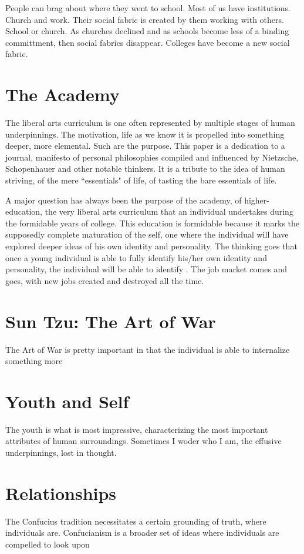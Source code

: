 \documentclass[12pt,letterpaper]{article}
\begin{document}
People can brag about where they went to school.  Most of us have institutions.  Church and work.  Their social fabric is created by them working with others.  School or church.  As churches declined and as schools become less of a binding committment, then social fabrics disappear.  Colleges have become a new social fabric.  



\section{The Academy}
The liberal arts curriculum is one often represented by multiple stages of human underpinnings.  The motivation, life as we know it is propelled into something deeper, more elemental.  Such are the purpose.  This paper is a dedication to a journal, manifesto of personal philosophies compiled and influenced by Nietzsche, Schopenhauer and other notable thinkers.  It is a tribute to the idea of human striving, of the mere ``essentials" of life, of tasting the bare essentials of life.

A major question has always been the purpose of the academy, of higher-education, the very liberal arts curriculum that an individual undertakes during the formidable years of college.  This education is formidable because it marks the supposedly complete maturation of the self, one where the individual will have explored deeper ideas of his own identity and personality.  The thinking goes that once a young individual is able to fully identify his/her own identity and personality, the individual will be able to identify .  The job market comes and goes, with new jobs created and destroyed all the time.

\section{Sun Tzu: The Art of War}
The Art of War is pretty important in that the individual is able to internalize something more 

\section{Youth and Self}

The youth is what is most impressive, characterizing the most important attributes of human surroundings.  Sometimes I woder who I am, the effusive underpinnings, lost in thought.

\section{Relationships}
The Confucius tradition necessitates a certain grounding of truth, where individuals are.  Confucianism is a broader set of ideas where individuals are compelled to look upon
\end{document}
